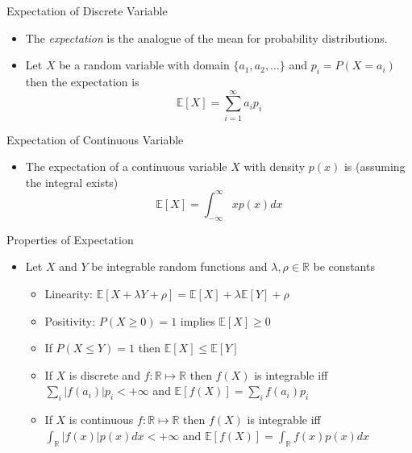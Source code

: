 \documentclass{beamer}
\begin{document}
\begin{frame}{Expectation of Discrete Variable} 
\begin{itemize} 
 \item The \emph{expectation} is the analogue of the mean for probability distributions.
 \item Let $X$ be a random variable with domain $\{a_1, a_2, \ldots \}$ and $p_i = P(X = a_i)$ then the expectation is 
 \begin{displaymath} 
  \mathbb{E}[X] = \sum_{i=1}^\infty a_i p_i
 \end{displaymath}
\end{itemize}
\end{frame}

\begin{frame}{Expectation of Continuous Variable} 
\begin{itemize} 
 \item The expectation of a continuous variable $X$ with density $p(x)$ is (assuming the integral exists) 
 \begin{displaymath} 
  \mathbb{E}[X] = \int_{-\infty}^\infty x p(x) dx
 \end{displaymath}
\end{itemize}
\end{frame}

\begin{frame}{Properties of Expectation} 
\begin{itemize} 
 \item Let $X$ and $Y$ be integrable random functions and $\lambda, \rho \in \mathbb{R}$ be constants
 \begin{itemize}
 \item Linearity: $\mathbb{E}[X + \lambda Y + \rho] = \mathbb{E}[X] +  \lambda \mathbb{E}[Y] + \rho$ 
 \item Positivity: $P(X \geq 0) = 1$ implies $\mathbb{E}[X] \geq 0$ 
 \item If $P(X \leq Y) = 1$ then $\mathbb{E}[X] \leq \mathbb{E}[Y]$
\item If $X$ is discrete and $f: \mathbb{R} \mapsto \mathbb{R}$ then $f(X)$ is integrable iff $\sum_i |f(a_i)| p_i < + \infty$ and $\mathbb{E}[f(X)] =  \sum_i f(a_i) p_i$ 
\item If $X$ is continuous $f: \mathbb{R} \mapsto \mathbb{R}$ then $f(X)$ is integrable iff $\int_\mathbb{R} |f(x)| p(x) dx < +\infty$ and $\mathbb{E}[f(X)] = \int_\mathbb{R} f(x)p(x) dx $ 
\end{itemize} 
\end{itemize} 
\end{frame}
\end{document}

